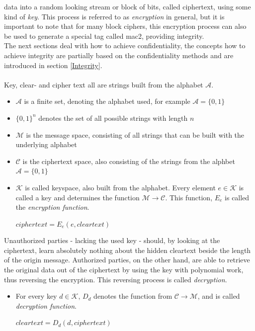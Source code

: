data into a random looking stream or block of bits, called ciphertext, using some kind of
\textit{key}. This process is referred to as \textit{encryption} in general, but it is important to note that for many block ciphers, this encryption process
can also be used to generate a special tag called \gls{mac2}, providing integrity.
\\
The next sections deal with how to achieve confidentiality, the 
concepts how to achieve integrity are partially based on the confidentiality methods and are introduced in section \ref{Integrity}.
\\
\\
Key, clear- and cipher text all are strings built from the alphabet $\mathcal{A}$. 
\begin{itemize}
 \item $\mathcal{A}$ is a finite set, denoting the alphabet used, for example
 $\mathcal{A} = \{0, 1\}$
 \item $\{0, 1\}^n$ denotes the set of all possible strings with length $n$
 \item $\mathcal{M}$ is the message space, consisting of all strings that can be built with the 
 underlying alphabet
 \item $\mathcal{C}$ is the ciphertext space, also consisting of the strings from 
 the alphbet
$\mathcal{A} = \{0, 1\}$
\item $\mathcal{K}$ is called keyspace, also built from the alphabet. Every element
 $e \in \mathcal{K}$ is called a key and determines the function $\mathcal{M} \rightarrow \mathcal{C}$.
 This function, $E_e$ is called the \textit{encryption function}. 
  \begin{center}
 $ciphertext = E_e(e, cleartext)$
  \end{center}
\end{itemize}
Unauthorized parties - lacking the used key - should, by looking at the ciphertext, learn
absolutely nothing about the hidden cleartext beside the length of the origin message. Authorized parties, on the other hand, are
able to retrieve the original data out of the ciphertext by using the key with polynomial work, thus reversing
the encryption. This reversing process is called \textit{decryption}.
\begin{itemize}
 \item For every key $d \in \mathcal{K}$, $D_d$ denotes the function from $\mathcal{C} \rightarrow
  \mathcal{M}$, and is called \textit{decryption function}.
  \begin{center}
  $cleartext  = D_d(d, ciphertext)$
    \end{center}
\end{itemize}
